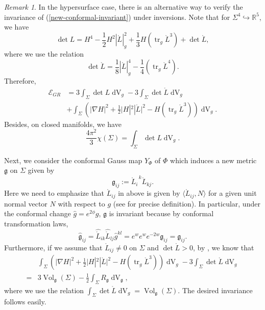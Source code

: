 \documentclass[11pt,letterpaper]{amsart}
\DeclareMathOperator{\tr}{tr}
\DeclareMathOperator{\Vol}{Vol}
\DeclareMathOperator{\dvol}{dV}
\newcommand{\mE}{\mathcal{E}}
\newcommand{\kg}{\mathfrak{g}}
\newcommand{\bR}{\mathbb{R}}
\theoremstyle{definition}
\theoremstyle{remark}
\newtheorem{remark}[theorem]{Remark}
\numberwithin{equation}{section}
\begin{document}
\begin{remark}
In the hypersurface case, there is an alternative way to verify the invariance of (\ref{new-conformal-invariant}) under inversions. Note that for ${\Sigma^4\hookrightarrow \bR^5}$, we have
\begin{equation*}
    \det L=H^4-\frac{1}{2}H^2|\mathring{L}|^2_g+\frac{1}{3}H\left(\tr_g \mathring{L}^3\right)+\det \mathring{L},
\end{equation*}
where we use the relation
\begin{equation*}
    \det \mathring{L}=\frac{1}{8}|\mathring{L}|^4_g-\frac{1}{4}\left(\tr_g \mathring{L}^4\right).
\end{equation*}
Therefore,
\begin{equation}\label{decomposition of energy}
\begin{split}
    \mE_{GR}&=3\int_{\Sigma}\det L \dvol_g-3\int_{\Sigma}\det \mathring{L} \dvol_g\\
    &+\int_{\Sigma} \left(\big|\nabla H\big|^2+\frac{1}{2}\big|H|^2|\mathring{L}\big|^2-H\left(\tr_g \mathring{L}^3\right)\right)\dvol_g.
    \end{split}
\end{equation}
Besides, on closed manifolds, we have
\begin{equation}\label{CGB}
    \frac{4\pi^2}{3}\chi(\Sigma)=\int_{\Sigma}\det L \dvol_g.
\end{equation}

Next, we consider the conformal Gauss map $Y_{\Phi}$ of $\Phi$ which induces a new metric $\kg$ on $\Sigma$ given by
\begin{equation*}
    \kg_{ij}:=\mathring{L}_i^{\;\;k}\mathring{L}_{kj}.
\end{equation*}
Here we need to emphasize that $\mathring{L}_{ij}$ in above is given by $\langle \mathring{L}_{ij}, N\rangle $ for a given unit normal vector $N$ with respect to $g$ (see \cite[(26) and Lemma 3.1]{Martino23} for precise definition).
In particular, under the conformal change $\hat{g}=e^{2\phi}g$, $\kg$ is invariant because by conformal transformation laws,
\begin{equation*}
    \hat{\kg}_{ij}=\hat{\mathring{L}}_{ik}\hat{\mathring{L}}_{lj}\hat{g}^{kl}=e^{w}e^{w}e^{-2w} \kg_{ij}=\kg_{ij}.
\end{equation*}
Furthermore, if we assume that $\mathring{L}_{ij}\neq 0$ on $\Sigma$ and $\det \mathring{L}>0$, by \cite[Prop Theorem II]{Martino23}, we know that
\begin{equation*}
\begin{split}
    &\int_{\Sigma} \left(\big|\nabla H\big|^2+\frac{1}{2}\big|H|^2|\mathring{L}\big|^2-H\left(\tr_g \mathring{L}^3\right)\right)\dvol_g-3\int_{\Sigma}\det \mathring{L} \dvol_g\\
    =&3\Vol_{\kg}(\Sigma)-\frac{1}{2}\int_{\Sigma} R_{\kg}\dvol_{\kg},
    \end{split}
\end{equation*}
where we use the relation $\int_{\Sigma}\det \mathring{L} \dvol_g=\Vol_{\kg}(\Sigma)$. The desired invariance follows easily.
\end{remark}
\end{document}
